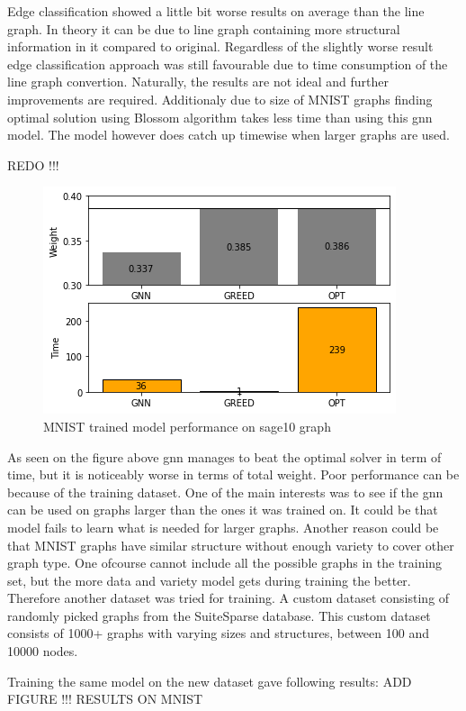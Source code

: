 Edge classification showed a little bit worse results on average than the line graph. In theory it can be due to line graph containing more structural information in it compared to original. Regardless of the slightly worse result edge classification approach was still favourable due to time consumption of the line graph convertion. Naturally, the results are not ideal and further improvements are required. Additionaly due to size of MNIST graphs finding optimal solution using Blossom algorithm takes less time than using this \gls{gnn} model. The model however does catch up timewise when larger graphs are used. 

REDO !!! 
\begin{figure}[H]
    \centering
    \includegraphics[scale=1.0]{figures/MNISTtrainSAGE10}
    \caption{MNIST trained model performance on sage10 graph}
    \label{model performance}
\end{figure}

As seen on the figure above \gls{gnn} manages to beat the optimal solver in term of time, but it is noticeably worse in terms of total weight. Poor performance can be because of the training dataset. One of the main interests was to see if the \gls{gnn} can be used on graphs larger than the ones it was trained on. It could be that model fails to learn what is needed for larger graphs. Another reason could be that MNIST graphs have similar structure without enough variety to cover other graph type. One ofcourse cannot include all the possible graphs in the training set, but the more data and variety model gets during training the better. Therefore another dataset was tried for training. A custom dataset consisting of randomly picked graphs from the SuiteSparse database. This custom dataset consists of 1000+ graphs with varying sizes and structures, between 100 and 10000 nodes.

Training the same model on the new dataset gave following results:
ADD FIGURE !!! RESULTS ON MNIST

